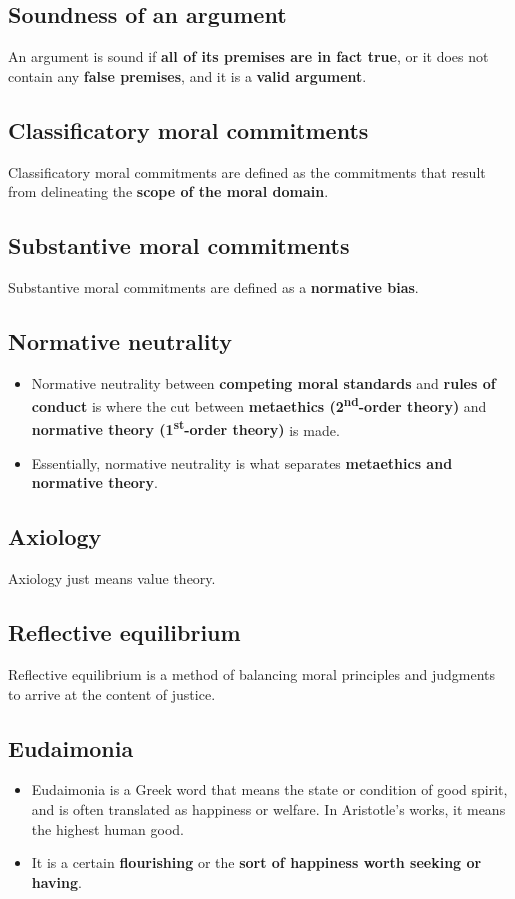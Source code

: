 \documentclass[11pt]{article}
\begin{document}
\subsection{Soundness of an argument}
\label{sec:orgf2a43cc}
An argument is sound if \textbf{all of its premises are in fact true}, or it does not contain any \textbf{false premises}, and it is a \textbf{valid argument}.
\subsection{Classificatory moral commitments}
\label{sec:org5765b61}
Classificatory moral commitments are defined as the commitments that result from delineating the \textbf{scope of the moral domain}.
\subsection{Substantive moral commitments}
\label{sec:orgca71c4a}
Substantive moral commitments are defined as a \textbf{normative bias}.
\subsection{Normative neutrality}
\label{sec:org5c5da99}
\begin{itemize}
\item Normative neutrality between \textbf{competing moral standards} and \textbf{rules of conduct} is where the cut between \textbf{metaethics (2\textsuperscript{nd}-order theory)} and \textbf{normative theory (1\textsuperscript{st}-order theory)} is made.
\item Essentially, normative neutrality is what separates \textbf{metaethics and normative theory}.
\end{itemize}
\subsection{Axiology}
\label{sec:org2d456b4}
Axiology just means value theory.
\subsection{Reflective equilibrium}
\label{sec:org46ad23c}
Reflective equilibrium is a method of balancing moral principles and judgments to arrive at the content of justice.

 \newpage
\subsection{Eudaimonia}
\label{sec:orge10d557}
\begin{itemize}
\item Eudaimonia is a Greek word that means the state or condition of good spirit, and is often translated as happiness or welfare. In Aristotle's works, it means the highest human good.
\item It is a certain \textbf{flourishing} or the \textbf{sort of happiness worth seeking or having}.
\end{itemize}
\end{document}
